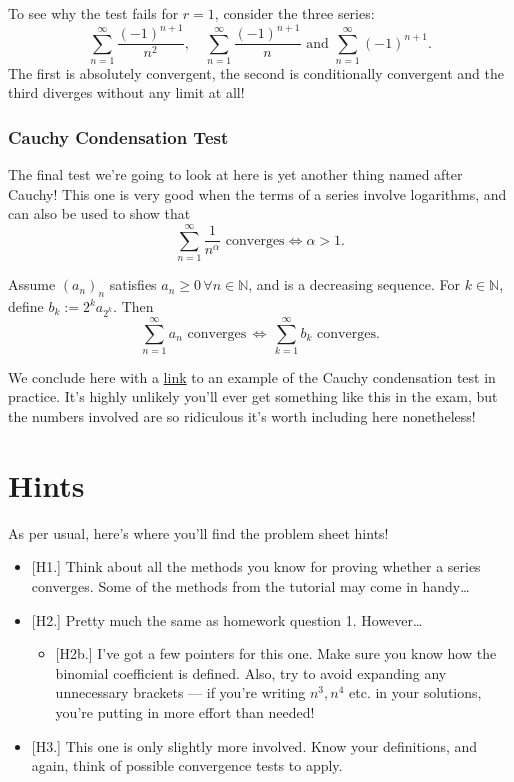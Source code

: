 \documentclass[
  17pt,
  a4paper]{extarticle}
\providecommand{\tightlist}{%
  \setlength{\itemsep}{0pt}\setlength{\parskip}{0pt}}
\theoremstyle{plain}
\theoremstyle{plain}
\theoremstyle{plain}
\theoremstyle{plain}
\theoremstyle{plain}
\theoremstyle{definition}
\theoremstyle{definition}
\theoremstyle{definition}
\theoremstyle{remark}
\let\BeginKnitrBlock\begin \let\EndKnitrBlock\end
\renewcommand{\;}{\,}
\begin{document}
To see why the test fails for \(r = 1\), consider the three series: \[\sum_{n = 1}^{\infty} \frac{(-1)^{n+1}}{n^2}, \quad \sum_{n = 1}^{\infty} \frac{(-1)^{n+1}}{n} \;\; \text{and} \;\; \sum_{n = 1}^{\infty} (-1)^{n+1}.\] The first is absolutely convergent, the second is conditionally convergent and the third diverges without any limit at all!

\hypertarget{cauchy-condensation-test}{%
\subsubsection{Cauchy Condensation Test}\label{cauchy-condensation-test}}

The final test we're going to look at here is yet another thing named after Cauchy! This one is very good when the terms of a series involve logarithms, and can also be used to show that \[\sum_{n = 1}^{\infty} \frac{1}{n^{\alpha}} \;\;\text{converges} \Longleftrightarrow \alpha > 1.\]

\BeginKnitrBlock{theorem}[Cauchy]
{\label{thm:thm5} }Assume \((a_n)_n\) satisfies \(a_n \geq 0 \; \forall n \in \mathbb{N}\), and is a decreasing sequence. For \(k \in \mathbb{N}\), define \(b_k := 2^ka_{2^k}\). Then \[\sum_{n = 1}^{\infty} a_n \;\; \text{converges}\; \Longleftrightarrow\; \sum_{k = 1}^{\infty} b_k \;\; \text{converges}.\]
\EndKnitrBlock{theorem}

We conclude here with a \href{https://math.stackexchange.com/questions/2071016/does-sum-infty-3-fracn2lnlnnlnn-converge?rq=1}{link} to an example of the Cauchy condensation test in practice. It's highly unlikely you'll ever get something like this in the exam, but the numbers involved are so ridiculous it's worth including here nonetheless!

\hypertarget{hints}{%
\section{Hints}\label{hints}}

As per usual, here's where you'll find the problem sheet hints!

\begin{itemize}
\tightlist
\item
  {[}H1.{]} Think about all the methods you know for proving whether a series converges. Some of the methods from the tutorial may come in handy\ldots{}
\item
  {[}H2.{]} Pretty much the same as homework question 1. However\ldots{}

  \begin{itemize}
  \tightlist
  \item
    {[}H2b.{]} I've got a few pointers for this one. Make sure you know how the binomial coefficient is defined. Also, try to avoid expanding any unnecessary brackets --- if you're writing \(n^3, n^4\) etc. in your solutions, you're putting in more effort than needed!
  \end{itemize}
\item
  {[}H3.{]} This one is only slightly more involved. Know your definitions, and again, think of possible convergence tests to apply.
\end{itemize}
\end{document}

